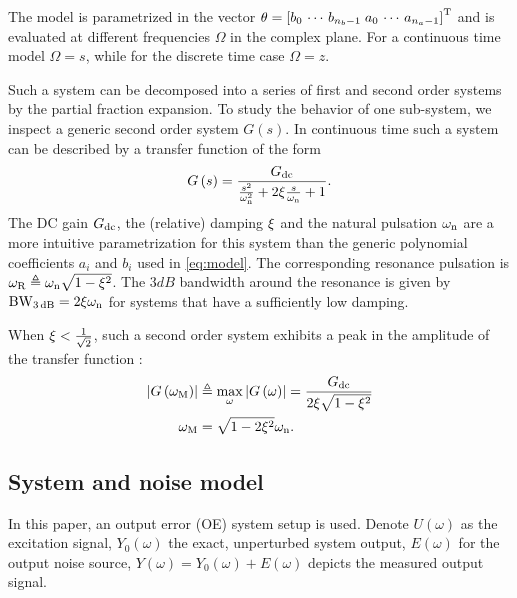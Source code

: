   The model is parametrized in the vector $\theta = \left[b_0 \,\cdots\, b_{n_b-1} \; a_0 \,\cdots\, a_{n_a-1} \right]^{\mathrm{T}}$ and  is evaluated at different frequencies $\Omega$ in the complex plane.
  For a continuous time model $\Omega = s$, while for the discrete time case $\Omega = z$.

  Such a system can be decomposed into a series of first and second order systems by the partial fraction expansion.
  To study the behavior of one sub-system, we inspect a generic second order system $G\left( s \right)$.
  In continuous time such a system can be described by a transfer function of the form
  \begin{equation}
    G\left(s \right) = \frac{G_{\mathrm{dc}}}
                            {             \frac{s^2}
                                               {\omega_{\mathrm{n}}^2} 
                             + 2 \xi \frac{s}
                                               {\omega_{\mathrm{n}}}
                             + 1
                            }
  \text{.}
  \label{eq:secondOrderSystemCT}
  \end{equation}
  The DC gain $G_{\mathrm{dc}}$, the (relative) damping $\xi$ and the natural pulsation $\omega_{\mathrm{n}}$ are a more intuitive parametrization for this system than the generic polynomial coefficients $a_i$ and $b_i$ used in \eqref{eq:model}.
  The corresponding resonance pulsation is $\omega_{\mathrm{R}} \triangleq \omega_{\mathrm{n}} \sqrt{1-\xi^2}$.
  The $3\unit{dB}$ bandwidth around the resonance is given by $\mathrm{BW}_{3\,\mathrm{dB}} = 2\xi\omega_{\mathrm{n}}$ for systems that have a sufficiently low damping.
  
  When $\xi < \frac{1}{\sqrt{2}}$, such a second order system exhibits a peak in
  the amplitude of the transfer function \citep{Oppenheim1983}:
  \begin{align}
   \left| G\left(\omega_{\mathrm{M}} \right) \right| & \triangleq
          \max_{\omega} \left| G\left( \omega \right)  \right|
        = \frac{G_{\mathrm{dc}}}
               {2 \xi \sqrt{1-\xi^2}}
               \label{eq:peakAmplitude}\\
   \omega_{\mathrm{M}} &
        = \sqrt{1-2\xi^2} \omega_{\mathrm{n}}
        \label{eq:peakFrequency}
    \text{.}
  \end{align}

\subsection{System and noise model}
  In this paper, an output error (OE) system setup is used.
  Denote
    $U  \left(\omega\right)$ as the excitation signal,
    $Y_0\left(\omega\right)$ the exact, unperturbed system output,
    $E  \left(\omega\right)$ for the output noise source,
    $Y  \left(\omega\right) = Y_0\left( \omega \right) + E\left( \omega \right)$ depicts the measured output signal.

